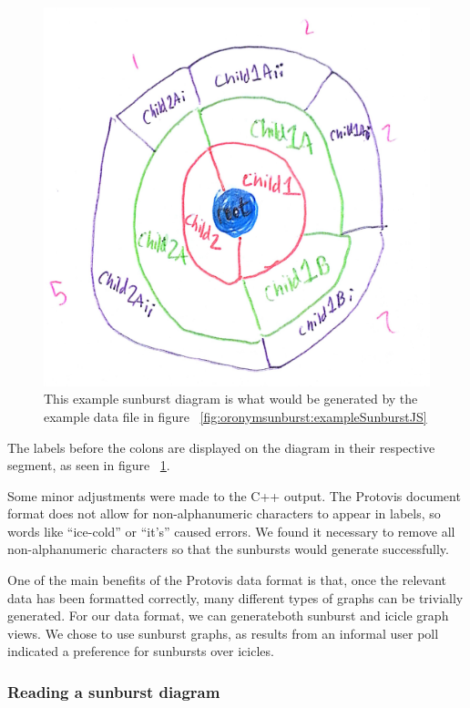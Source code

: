 \begin{figure}
\includegraphics[width=150mm]{SunburstExampleDiagramRough.jpg}
\captionfonts
\caption[Example Sunburst Diagram]{ This example sunburst diagram is what would be generated by the example data file in figure ~\ref{fig:oronymsunburst:exampleSunburstJS} }
\label{fig:oronymSunburst:exampleSunburst}
\end{figure}


The labels before the colons are displayed on the diagram in their respective segment, as seen in figure ~\ref{fig:oronymSunburst:exampleSunburst}. 

Some minor adjustments were made to the C++ output. The Protovis document format does not allow for non-alphanumeric characters to appear in labels, so words like ``ice-cold'' or ``it's'' caused errors. We found it necessary to remove all non-alphanumeric characters so that the sunbursts would generate successfully. 

One of the main benefits of the Protovis data format is that, once the relevant data has been formatted correctly, many different types of graphs can be trivially generated. For our data format, we can generateboth sunburst and icicle graph views.  We chose to use sunburst graphs, as results from an informal user poll indicated a preference for sunbursts over icicles.

\subsubsection{Reading a sunburst diagram}
\label{subsection:oronymsunburst:readingASunburstDiagram}


